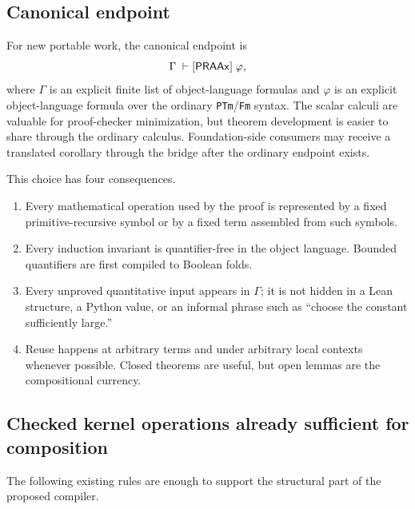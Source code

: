 \subsection{Canonical endpoint}

For new portable work, the canonical endpoint is
\begin{equation}
  \Gamma\;\vdash[\mathsf{PRAAx}]\;\varphi,
  \label{eq:canonical-endpoint}
\end{equation}
where \(\Gamma\) is an explicit finite list of object-language formulas and \(\varphi\) is an explicit object-language formula over the ordinary \texttt{PTm}/\texttt{Fm} syntax.  The scalar calculi are valuable for proof-checker minimization, but theorem development is easier to share through the ordinary calculus.  Foundation-side consumers may receive a translated corollary through the bridge after the ordinary endpoint exists.

This choice has four consequences.

\begin{enumerate}[leftmargin=2.2em]
\item Every mathematical operation used by the proof is represented by a fixed primitive-recursive symbol or by a fixed term assembled from such symbols.
\item Every induction invariant is quantifier-free in the object language.  Bounded quantifiers are first compiled to Boolean folds.
\item Every unproved quantitative input appears in \(\Gamma\); it is not hidden in a Lean structure, a Python value, or an informal phrase such as ``choose the constant sufficiently large.''
\item Reuse happens at arbitrary terms and under arbitrary local contexts whenever possible.  Closed theorems are useful, but open lemmas are the compositional currency.
\end{enumerate}

\subsection{Checked kernel operations already sufficient for composition}

The following existing rules are enough to support the structural part of the proposed compiler.

